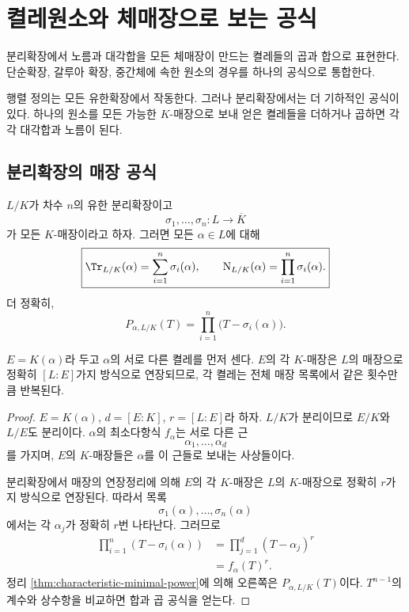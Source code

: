 \clearpage
\section{켤레원소와 체매장으로 보는 공식}
\label{sec:conjugates-embeddings-norm-trace}

\begin{learninggoal}
분리확장에서 노름과 대각합을 모든 체매장이 만드는 켤레들의 곱과 합으로 표현한다. 단순확장, 갈루아 확장, 중간체에 속한 원소의 경우를 하나의 공식으로 통합한다.
\end{learninggoal}

행렬 정의는 모든 유한확장에서 작동한다. 그러나 분리확장에서는 더 기하적인 공식이 있다. 하나의 원소를 모든 가능한 $K$-매장으로 보내 얻은 켤레들을 더하거나 곱하면 각각 대각합과 노름이 된다.

\subsection{분리확장의 매장 공식}

\begin{theorem}[켤레들의 합과 곱]
\label{thm:norm-trace-embeddings}
$L/K$가 차수 $n$의 유한 분리확장이고
\[
  \sigma_1,\dots,\sigma_n:L\longrightarrow\overline K
\]
가 모든 $K$-매장이라고 하자. 그러면 모든 $\alpha\in L$에 대해
\[
  \boxed{
  \Tr_{L/K}(\alpha)
  =\sum_{i=1}^n\sigma_i(\alpha),
  \qquad
  \operatorname N_{L/K}(\alpha)
  =\prod_{i=1}^n\sigma_i(\alpha).}
\]
더 정확히,
\[
  \boxed{
  P_{\alpha,L/K}(T)
  =\prod_{i=1}^n\bigl(T-\sigma_i(\alpha)\bigr).}
\]
\end{theorem}

\begin{proofidea}
$E=K(\alpha)$라 두고 $\alpha$의 서로 다른 켤레를 먼저 센다. $E$의 각 $K$-매장은 $L$의 매장으로 정확히 $[L:E]$가지 방식으로 연장되므로, 각 켤레는 전체 매장 목록에서 같은 횟수만큼 반복된다.
\end{proofidea}

\begin{proof}
$E=K(\alpha)$, $d=[E:K]$, $r=[L:E]$라 하자. $L/K$가 분리이므로 $E/K$와 $L/E$도 분리이다. $\alpha$의 최소다항식 $f_\alpha$는 서로 다른 근
\[
  \alpha_1,\dots,\alpha_d
\]
를 가지며, $E$의 $K$-매장들은 $\alpha$를 이 근들로 보내는 사상들이다.

분리확장에서 매장의 연장정리에 의해 $E$의 각 $K$-매장은 $L$의 $K$-매장으로 정확히 $r$가지 방식으로 연장된다. 따라서 목록
\[
  \sigma_1(\alpha),\dots,\sigma_n(\alpha)
\]
에서는 각 $\alpha_j$가 정확히 $r$번 나타난다. 그러므로
\[
\begin{aligned}
  \prod_{i=1}^n(T-\sigma_i(\alpha))
  &=\prod_{j=1}^d(T-\alpha_j)^r\\
  &=f_\alpha(T)^r.
\end{aligned}
\]
정리 \ref{thm:characteristic-minimal-power}에 의해 오른쪽은 $P_{\alpha,L/K}(T)$이다. $T^{n-1}$의 계수와 상수항을 비교하면 합과 곱 공식을 얻는다.
\end{proof}

